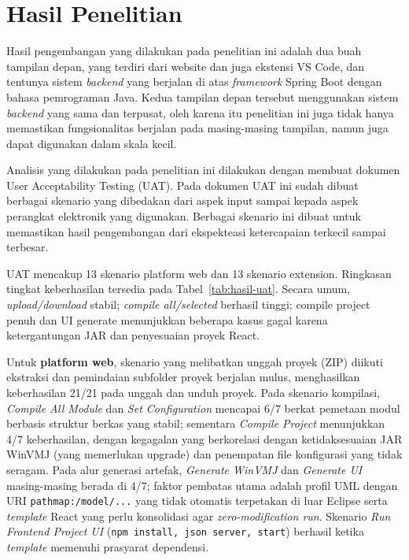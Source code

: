 \documentclass[12pt,a4paper,onecolumn]{article}
\begin{document}
\section*{Hasil Penelitian}
\vspace{10pt}

Hasil pengembangan yang dilakukan pada penelitian ini adalah dua buah tampilan depan, yang terdiri dari website dan juga ekstensi VS Code, dan tentunya sistem \textit{backend} yang berjalan di atas \textit{framework} Spring Boot dengan bahasa pemrograman Java. Kedua tampilan depan tersebut menggunakan sistem \textit{backend} yang sama dan terpusat, oleh karena itu penelitian ini juga tidak hanya memastikan fungsionalitas berjalan pada masing-masing tampilan, namun juga dapat digunakan dalam skala kecil. 

Analisis yang dilakukan pada penelitian ini dilakukan dengan membuat dokumen User Acceptability Testing (UAT). Pada dokumen UAT ini sudah dibuat berbagai skenario yang dibedakan dari aspek input sampai kepada aspek perangkat elektronik yang digunakan. Berbagai skenario ini dibuat untuk memastikan hasil pengembangan dari ekspekteasi ketercapaian terkecil sampai terbesar. 

UAT mencakup 13 skenario platform web dan 13 skenario extension. Ringkasan tingkat keberhasilan tersedia pada Tabel~\ref{tab:hasil-uat}. Secara umum, \textit{upload/download} stabil; \textit{compile all/selected} berhasil tinggi; compile project penuh dan UI generate menunjukkan beberapa kasus gagal karena ketergantungan JAR dan penyesuaian proyek React.

Untuk \textbf{platform web}, skenario yang melibatkan unggah proyek (ZIP) diikuti ekstraksi dan pemindaian subfolder proyek berjalan mulus, menghasilkan keberhasilan 21/21 pada unggah dan unduh proyek. Pada skenario kompilasi, \textit{Compile All Module} dan \textit{Set Configuration} mencapai 6/7 berkat pemetaan modul berbasis struktur berkas yang stabil; sementara \textit{Compile Project} menunjukkan 4/7 keberhasilan, dengan kegagalan yang berkorelasi dengan ketidaksesuaian JAR WinVMJ (yang memerlukan upgrade) dan penempatan file konfigurasi yang tidak seragam. Pada alur generasi artefak, \textit{Generate WinVMJ} dan \textit{Generate UI} masing-masing berada di 4/7; faktor pembatas utama adalah profil UML dengan URI \texttt{pathmap:/model/...} yang tidak otomatis terpetakan di luar Eclipse serta \textit{template} React yang perlu konsolidasi agar \textit{zero-modification run}. Skenario \textit{Run Frontend Project UI} (\texttt{npm install, json server, start}) berhasil ketika \textit{template} memenuhi prasyarat dependensi.
\end{document}
